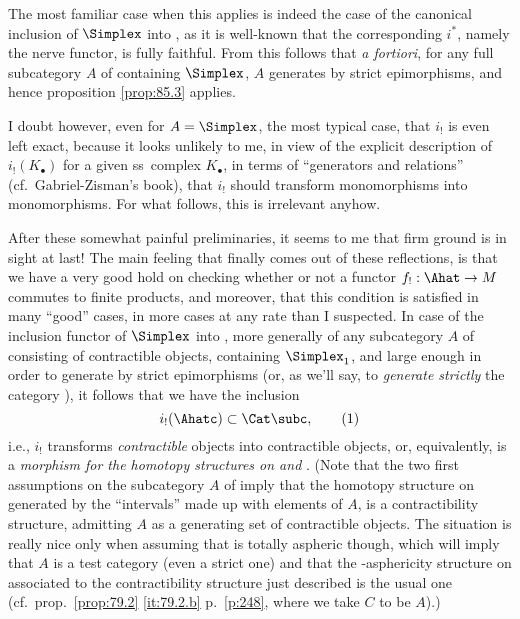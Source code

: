 The most familiar case when this applies is indeed the case of the
canonical inclusion of $\Simplex$ into \Cat, as it is well-known that
the corresponding $i^*$, namely the nerve functor, is fully
faithful. From this follows that \emph{a fortiori},
for any full subcategory $A$ of \Cat{} containing $\Simplex$, $A$
generates \Cat{} by strict epimorphisms, and hence proposition
\ref{prop:85.3} applies.
\begin{remarknum}\label{rem:85.3}
  I doubt however, even for $A=\Simplex$, the most typical
  case, that $i_!$ is even left exact, because it looks
  unlikely to me, in view of the explicit description of
  $i_!(K_\bullet)$ for a given ss~complex $K_\bullet$, in terms of
  ``generators and relations'' (cf.\ Gabriel-Zisman's
  book), that $i_!$ should
  transform monomorphisms into monomorphisms. For what follows, this
  is irrelevant anyhow.
\end{remarknum}

\label{sec:86}%
After these somewhat painful preliminaries, it seems to me that firm
ground is in sight at last! The main feeling that finally comes out of
these reflections, is that we have a very good hold on checking
whether or not a functor $f_!:\Ahat\to M$ commutes to finite products,
and moreover, that this condition is satisfied in many ``good'' cases,
in more cases at any rate than I suspected. In case of the inclusion
functor of $\Simplex$ into \Cat, more generally of any subcategory $A$
of \Cat{} consisting of contractible objects, containing $\Simplex_1$,
and large enough in order to generate \Cat{} by strict epimorphisms
(or, as we'll say, to \emph{generate strictly} the category \Cat), it
follows that we have the inclusion
\begin{equation}
  \label{eq:86.1}
  i_!(\Ahatc) \subset \Cat\subc,\tag{1}
\end{equation}
i.e., $i_!$ transforms \emph{contractible} objects into contractible
objects, or, equivalently, is a \emph{morphism for the homotopy
  structures on \Ahat{} and \Cat}. (Note that the two first
assumptions on the subcategory $A$ of \Cat{} imply that the homotopy
structure on \Ahat{} generated by the ``intervals'' made up with
elements of $A$, is a contractibility structure, admitting $A$ as a
generating set of contractible objects. The situation is really nice
only when assuming that \Ahat{} is totally aspheric though, which will
imply that $A$ is a test category (even a strict one) and that the
\scrW-asphericity structure on \Ahat{} associated to the
contractibility structure just described is the usual one (cf.\ prop.\
\ref{prop:79.2} \ref{it:79.2.b} p.\ \ref{p:248}, where we take $C$ to
be $A$).)

